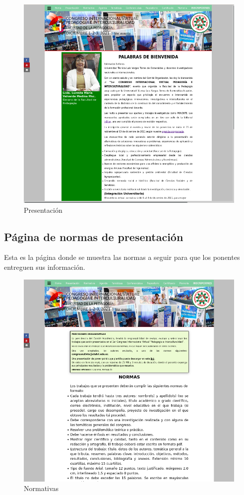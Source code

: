 \documentclass[a4paper,14px]{article}
\begin{document}
\begin{figure}[H]
  \centering
  \includegraphics[scale=0.6]{presentacion.png}
  \caption{Presentación}
  \label{fig:arquitectura}
\end{figure}

\newpage
\subsection{Página de normas de presentación }
\label{sec:pagina-principal}

Esta es la página  donde se muestra las normas a seguir para que los ponentes entreguen sus información.



\begin{figure}[H]
  \centering
  \includegraphics[scale=0.6]{normativas.png}
  \caption{Normativas}
  \label{fig:arquitectura}
\end{figure}
\end{document}
